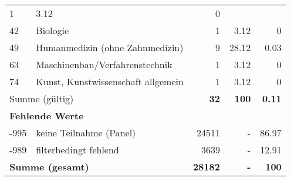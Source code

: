 \begin{longtable}{lXrrr}
       \num{1} &
       \num[round-mode=places,round-precision=2]{3,12} &
         \num[round-mode=places,round-precision=2]{0} \\

     42 &
     \multicolumn{1}{X}{ Biologie   } &


       \num{1} &
       \num[round-mode=places,round-precision=2]{3,12} &
         \num[round-mode=places,round-precision=2]{0} \\

     49 &
     \multicolumn{1}{X}{ Humanmedizin (ohne Zahnmedizin)   } &


       \num{9} &
       \num[round-mode=places,round-precision=2]{28,12} &
         \num[round-mode=places,round-precision=2]{0,03} \\

     63 &
     \multicolumn{1}{X}{ Maschinenbau/Verfahrenstechnik   } &


       \num{1} &
       \num[round-mode=places,round-precision=2]{3,12} &
         \num[round-mode=places,round-precision=2]{0} \\

     74 &
     \multicolumn{1}{X}{ Kunst, Kunstwissenschaft allgemein   } &


       \num{1} &
       \num[round-mode=places,round-precision=2]{3,12} &
         \num[round-mode=places,round-precision=2]{0} \\
     \midrule
     \multicolumn{2}{l}{Summe (gültig)} &
       \textbf{\num{32}} &
     \textbf{100} &
       \textbf{\num[round-mode=places,round-precision=2]{0,11}} \\
     \multicolumn{5}{l}{\textbf{Fehlende Werte}}\\
       -995 &
       keine Teilnahme (Panel) &
         \num{24511} &
        - &
         \num[round-mode=places,round-precision=2]{86,97} \\
       -989 &
       filterbedingt fehlend &
         \num{3639} &
        - &
         \num[round-mode=places,round-precision=2]{12,91} \\
     \midrule
     \multicolumn{2}{l}{\textbf{Summe (gesamt)}} &
          \textbf{\num{28182}} &
        \textbf{-} &
        \textbf{100} \\
     \bottomrule
     \end{longtable}
     
